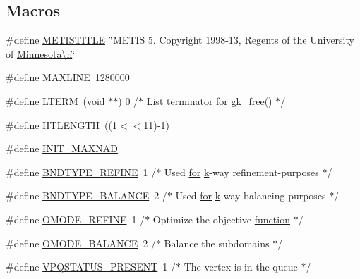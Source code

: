 \subsection*{Macros}
\begin{DoxyCompactItemize}
\item 
\#define \hyperlink{a00888_ae7a29a77e5896a2008bde6a2b3b0334c}{M\+E\+T\+I\+S\+T\+I\+T\+LE}~\char`\"{}M\+E\+T\+IS 5. Copyright 1998-\/13, Regents of the University of \hyperlink{a00623_a781a04ab095280f838ff3eb0e51312e0}{Minnesota\textbackslash{}n}\char`\"{}
\item 
\#define \hyperlink{a00888_a3e937c42922f7601edb17b747602c471}{M\+A\+X\+L\+I\+NE}~1280000
\item 
\#define \hyperlink{a00888_ad187417622643f86341db4a2e1cf6a37}{L\+T\+E\+RM}~(void $\ast$$\ast$) 0	/$\ast$ List terminator \hyperlink{a00623_ad1e7380d51df1e0043d24d3c8a860e0a}{for} \hyperlink{a00110_ac8df62c4e3d0910711a9874f9cc58884}{gk\+\_\+free}() $\ast$/
\item 
\#define \hyperlink{a00888_a6748d9d62655cf196bde247a10e75ac2}{H\+T\+L\+E\+N\+G\+TH}~((1$<$$<$11)-\/1)
\item 
\#define \hyperlink{a00888_ab1ee2f6bee3318f212cd85b000227ded}{I\+N\+I\+T\+\_\+\+M\+A\+X\+N\+AD}
\item 
\#define \hyperlink{a00888_a233ac25cf2dac8a634c2e40902bb90dc}{B\+N\+D\+T\+Y\+P\+E\+\_\+\+R\+E\+F\+I\+NE}~1       /$\ast$ Used \hyperlink{a00623_ad1e7380d51df1e0043d24d3c8a860e0a}{for} \hyperlink{a00605_a6086917dfee54d84abe1838505c8cf69}{k}-\/way refinement-\/purposes $\ast$/
\item 
\#define \hyperlink{a00888_aa84d7d58d23dd7cd43633ad60f34a4ab}{B\+N\+D\+T\+Y\+P\+E\+\_\+\+B\+A\+L\+A\+N\+CE}~2       /$\ast$ Used \hyperlink{a00623_ad1e7380d51df1e0043d24d3c8a860e0a}{for} \hyperlink{a00605_a6086917dfee54d84abe1838505c8cf69}{k}-\/way balancing purposes $\ast$/
\item 
\#define \hyperlink{a00888_a5bd10a936523fa1f56c01554eef319d6}{O\+M\+O\+D\+E\+\_\+\+R\+E\+F\+I\+NE}~1       /$\ast$ Optimize the objective \hyperlink{a00611_a2420833d971716e9bab41cc9fb3abba1}{function} $\ast$/
\item 
\#define \hyperlink{a00888_a47636328bc8ba1e5798d704b94866a78}{O\+M\+O\+D\+E\+\_\+\+B\+A\+L\+A\+N\+CE}~2       /$\ast$ Balance the subdomains $\ast$/
\item 
\#define \hyperlink{a00888_a7e0df98c29dfc357c0c216146b027a2f}{V\+P\+Q\+S\+T\+A\+T\+U\+S\+\_\+\+P\+R\+E\+S\+E\+NT}~1       /$\ast$ The vertex is in the queue $\ast$/
\item 

\end{DoxyCompactItemize}
